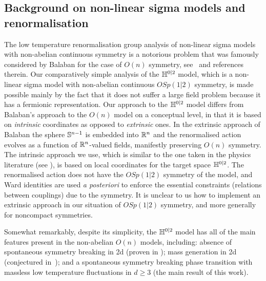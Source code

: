 \documentclass[11pt]{amsart}
\numberwithin{equation}{section}
\numberwithin{theorem}{section}
\newcommand{\1}{{\bf 1}}
\begin{document}
\subsection{Background on non-linear sigma models and renormalisation}
The low temperature renormalisation group analysis of non-linear sigma
models with non-abelian continuous symmetry is a notorious problem
that was famously considered by Balaban for the case of $O(n)$
symmetry, see~\cite{MR1670021,MR1669693} and references therein.  Our
comparatively simple analysis of the $\mathbb{H}^{0|2}$ model, which is a
non-linear sigma model with non-abelian continuous $OSp(1|2)$
symmetry, is made possible mainly by the fact that it does not suffer
a large field problem because it has a fermionic representation.  Our
approach to the $\mathbb{H}^{0|2}$ model differs from Balaban's approach to
the $O(n)$ model on a conceptual level, in that it is based on
\emph{intrinsic} coordinates as opposed to \emph{extrinsic} ones.
In the extrinsic approach of Balaban the sphere ${\mathbb S}^{n-1}$ is
embedded into $\mathbb{R}^n$ and the renormalised action evolves as a
function of $\mathbb{R}^n$-valued fields, manifestly preserving $O(n)$
symmetry.  The intrinsic approach we use, which is similar to the
one taken in the physics literature (see \cite{MR1227790}), is based
on local coordinates for the target space ${\mathbb H}^{0|2}$. The
renormalised action does not have the $OSp(1|2)$ symmetry of the
model, and Ward identities are used \emph{a posteriori} to enforce
the essential constraints (relations between couplings) due to the
symmetry. It is unclear to us how to implement an extrinsic
approach in our situation of $OSp(1|2)$ symmetry, and more
generally for noncompact symmetries.

Somewhat remarkably, despite its
simplicity, the $\mathbb{H}^{0|2}$ model has all of the main features present
in the non-abelian $O(n)$ models, including: absence of spontaneous
symmetry breaking in 2d (proven in \cite{MR4218682}); mass generation
in 2d (conjectured in~\cite{MR3622573}); and a spontaneous symmetry
breaking phase transition with massless low temperature fluctuations
in $d\geq 3$ (the main result of this work).
\end{document}
